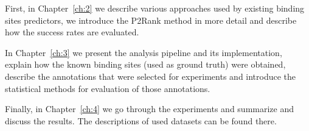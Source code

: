 First, in Chapter~\ref{ch:2} we describe various approaches used by existing binding sites predictors, we introduce the P2Rank method in more detail and describe how the success rates are evaluated.

In Chapter~\ref{ch:3} we present the analysis pipeline and its implementation, explain how the known binding sites (used as ground truth) were obtained, describe the annotations that were selected for experiments and introduce the statistical methods for evaluation of those annotations. 

Finally, in Chapter~\ref{ch:4} we go through the experiments and summarize and discuss the results. The descriptions of used datasets can be found there.
